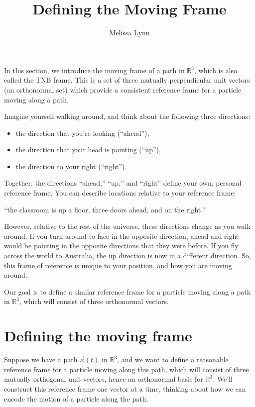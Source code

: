 \documentclass{ximera}
\title{Defining the Moving Frame}
\author{Melissa Lynn}
\begin{document}
\begin{abstract}
\end{abstract}
\maketitle

In this section, we introduce the moving frame of a path in $\mathbb{R}^3$, which is also called the TNB frame. This is a set of three mutually perpendicular unit vectors (an orthonormal set) which provide a consistent reference frame for a particle moving along a path.

Imagine yourself walking around, and think about the following three directions:
\begin{itemize}
\item the direction that you're looking (``ahead''),
\item the direction that your head is pointing (``up''),
\item the direction to your right (``right'').
\end{itemize}
Together, the directions ``ahead,'' ``up,'' and ``right'' define your own, personal reference frame. You can describe locations relative to your reference frame:
\begin{center}
``the classroom is up a floor, three doors ahead, and on the right.'' 
\end{center}
However, relative to the rest of the universe, these directions change as you walk around. If you turn around to face in the opposite direction, ahead and right would be pointing in the opposite directions that they were before. If you fly across the world to Australia, the up direction is now in a different direction. So, this frame of reference is unique to your position, and how you are moving around.

Our goal is to define a similar reference frame for a particle moving along a path in $\mathbb{R}^3$, which will consist of three orthonormal vectors. 

\section*{Defining the moving frame}

Suppose we have a path $\vec{x}(t)$ in $\mathbb{R}^3$, and we want to define a reasonable reference frame for a particle moving along this path, which will consist of three mutually orthogonal unit vectors, hence an orthonormal basis for $\mathbb{R}^3$. We'll construct this reference frame one vector at a time, thinking about how we can encode the motion of a particle along the path.
\end{document}
